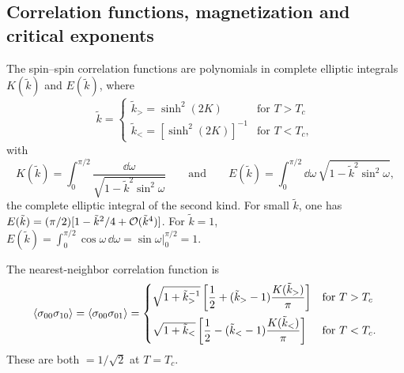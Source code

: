 \subsection{Correlation functions, magnetization and critical exponents}

The spin--spin correlation functions are polynomials in complete elliptic integrals $K(\tilde k)$ and
$E(\tilde k)$, where
\begin{equation}
  \tilde k = \begin{cases}\tilde k_> = \sinh^2(2K) & \text{for } T>T_c\\
                          \tilde k_< = [\sinh^2(2K)]^{-1} & \text{for } T<T_c,\end{cases}
\end{equation}
with
\begin{equation}
  K(\tilde k) = \int_0^{\pi/2}\frac{\dd\omega}{\sqrt{1-\tilde k^2\sin^2\omega}}
  \qquad\text{and}\qquad
  E(\tilde k) = \int_0^{\pi/2}\dd\omega\,\sqrt{1-\tilde k^2\sin^2\omega},
\end{equation}
the complete elliptic integral of the second kind. For small $\tilde k$, one has
$E(\tilde k) = (\pi/2)[1-\tilde k^2/4+\mathcal{O}(\tilde k^4)]$. For $\tilde k = 1$,
$E(\tilde k) = \int_0^{\pi/2}\cos\omega\,\dd\omega = \left.\sin\omega\right|_0^{\pi/2} = 1$.

\begin{diagram}
\end{diagram}

The nearest-neighbor correlation function is
\begin{equation}
  \langle \sigma_{00}\sigma_{10}\rangle = \langle \sigma_{00}\sigma_{01}\rangle =
  \begin{cases}
    \sqrt{1+\tilde k_>^{-1}}\left[\dfrac{1}{2} + (\tilde k_>-1)\dfrac{K(\tilde k_>)}{\pi}\right] & \text{for } T>T_c\\[10pt]
    \sqrt{1+\tilde k_<}\left[\dfrac{1}{2} - (\tilde k_<-1)\dfrac{K(\tilde k_<)}{\pi}\right] & \text{for } T<T_c .
  \end{cases}
\end{equation}
These are both $=1/\sqrt2$ at $T = T_c$.

